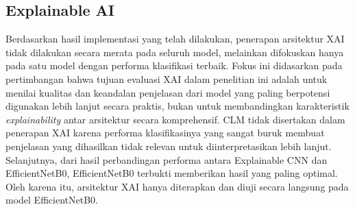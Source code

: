 \subsection{Explainable AI}
\label{sec:rancangan_XAI}
Berdasarkan hasil implementasi yang telah dilakukan, penerapan arsitektur XAI tidak dilakukan secara merata pada seluruh model, melainkan difokuskan hanya pada satu model dengan performa klasifikasi terbaik. Fokus ini didasarkan pada pertimbangan bahwa tujuan evaluasi XAI dalam penelitian ini adalah untuk menilai kualitas dan keandalan penjelasan dari model yang paling berpotensi digunakan lebih lanjut secara praktis, bukan untuk membandingkan karakteristik \textit{explainability} antar arsitektur secara komprehensif. CLM tidak disertakan dalam penerapan XAI karena performa klasifikasinya yang sangat buruk membuat penjelasan yang dihasilkan tidak relevan untuk diinterpretasikan lebih lanjut. Selanjutnya, dari hasil perbandingan performa antara Explainable CNN dan EfficientNetB0, EfficientNetB0 terbukti memberikan hasil yang paling optimal. Oleh karena itu, arsitektur XAI hanya diterapkan dan diuji secara langsung pada model EfficientNetB0.

